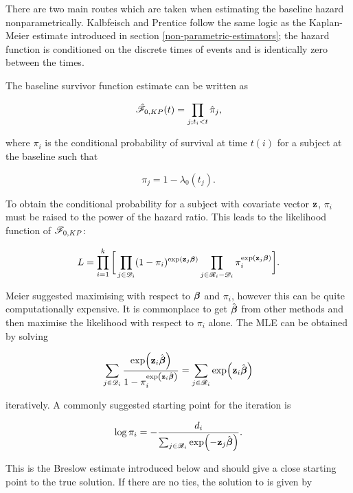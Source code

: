 There are two main routes which are taken when estimating the baseline hazard nonparametrically. Kalbfeisch and Prentice  follow the same logic as the Kaplan-Meier estimate introduced in section \ref{non-parametric-estimators}; the hazard function is conditioned on the discrete times of events and is identically zero between the times. 

The baseline survivor function estimate can be written as

\begin{equation}
    \hat{\mathscr{F}}_{0,KP}(t)=\prod_{j;t_i<t}\hat{\pi}_j,
\end{equation}

where $\pi_i$ is the conditional probability of survival at time $t(i)$ for a subject at the baseline such that

\begin{equation}
    \pi_j = 1 - \lambda_0(t_j).
\end{equation}

To obtain the conditional probability for a subject with covariate vector $\textbf{z}$, $\pi_i$ must be raised to the power of the hazard ratio. This leads to the likelihood function of $\mathscr{F}_{0,KP}$:

\begin{equation}\label{MLE-KP}
    L = \prod_{i=1}^k\bigg[\prod_{j\in\mathscr{D}_i}(1-\pi_i)^{\exp(\textbf{z}_j\boldsymbol{\beta})} \prod_{j\in\mathscr{R}_i-\mathscr{D}_i}\pi_i^{\exp(\textbf{z}_j\boldsymbol{\beta})}\bigg].
\end{equation}

Meier suggested maximising  with respect to $\boldsymbol{\beta}$ and $\pi_i$, however this can be quite computationally expensive. It is commonplace to get $\hat{\boldsymbol{\beta}}$ from other methods and then maximise the likelihood with respect to $\pi_i$ alone. The MLE can be obtained by solving

\begin{equation}\label{MLE-KP-max}
    \sum_{j\in\mathscr{D}_i} \frac{\exp(\textbf{z}_i\hat{\boldsymbol{\beta}})}{1-\pi_i^{\exp(\textbf{z}_i\hat{\boldsymbol{\beta}})}} = \sum_{j\in\mathscr{R}_i}\exp(\textbf{z}_i\hat{\boldsymbol{\beta}})
\end{equation}

iteratively. A commonly suggested starting point for the iteration is

\begin{equation}
    \log\pi_i = -\frac{d_i}{\sum_{j\in\mathscr{R}_i}\exp(-\textbf{z}_j\hat{\boldsymbol{\beta}})}.
\end{equation}

This is the Breslow estimate introduced below and should give a close starting point to the true solution. If there are no ties, the solution to  is given by

